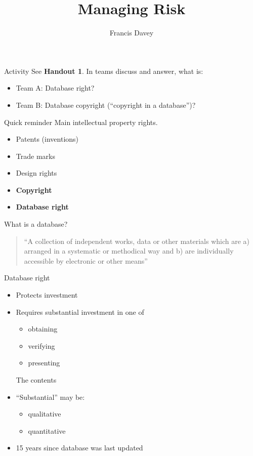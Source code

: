 \documentclass[aspectratio=169]{beamer}
\begin{document}
\title{Managing Risk}
\author{Francis Davey}
\begin{frame}
  \titlepage
\end{frame}
\begin{frame}{Activity}
See {\bf Handout 1}. In teams discuss and answer, what is:
  \begin{itemize}
  \item Team A: Database right?
  \item Team B: Database copyright (``copyright in a database'')?
  \end{itemize}
\end{frame}

\begin{frame}{Quick reminder}
Main intellectual property rights.
\begin{itemize}
\item Patents (inventions)
\item Trade marks 
\item Design rights
\item {\bf Copyright}
\item {\bf Database right}
\end{itemize}
\end{frame}

\begin{frame}{What is a database?}
  \begin{quote}
    ``A collection of independent works, data or other materials which are 
    a) arranged in a systematic or methodical way and 
    b) are individually accessible by electronic or other means''
  \end{quote}
\end{frame}

\begin{frame}{Database right}
  \begin{itemize}
  \item Protects investment
  \item Requires substantial investment in one of
    \begin{itemize}
    \item obtaining
    \item verifying
    \item presenting
    \end{itemize}
The contents
\item ``Substantial'' may be:
  \begin{itemize}
  \item qualitative
  \item quantitative
  \end{itemize}
\item 15 years since database was last updated
  \end{itemize}
\end{frame}
\end{document}
